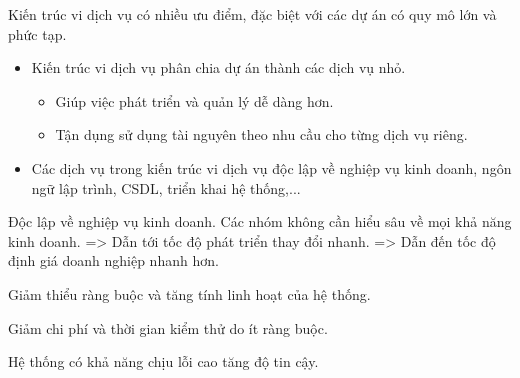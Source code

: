 Kiến trúc vi dịch vụ có nhiều ưu điểm, đặc biệt với các dự án có quy mô lớn và phức tạp.

\begin{itemize}

    \item Kiến trúc vi dịch vụ phân chia dự án thành các dịch vụ nhỏ.

          \begin{itemize}

              \item Giúp việc phát triển và quản lý dễ dàng hơn.

              \item Tận dụng sử dụng tài nguyên theo nhu cầu cho từng dịch vụ riêng.

          \end{itemize}

    \item Các dịch vụ trong kiến trúc vi dịch vụ độc lập về nghiệp vụ kinh doanh, ngôn ngữ lập trình, CSDL, triển khai hệ thống,...

\end{itemize}
Độc lập về nghiệp vụ kinh doanh.     
Các nhóm không cần hiểu sâu về mọi khả năng kinh doanh.
=>   Dẫn tới tốc độ phát triển thay đổi nhanh.
=>   Dẫn  đến tốc độ định giá doanh nghiệp nhanh hơn.







Giảm thiểu ràng buộc và tăng tính linh hoạt của hệ thống.

Giảm chi phí và thời gian kiểm thử do ít ràng buộc.

Hệ thống có khả năng chịu lỗi cao tăng độ tin cậy.



